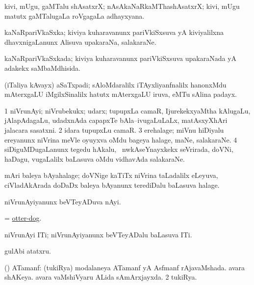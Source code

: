 \bentry
{}
\gl{\nA}
\bmng
kivi, mUgu, gaMTalu shAsatxrX; nAsAkaNaRkaMThashAsatxrX; kivi, mUgu matutx gaMTalugaLa roVgagaLa adhayxyana. 
\emng
\eentry

\bentry
{}
\gl{\nA}
\bmng
kaNaRpariVkaSxka; kiviya kuharavanunx pariVkiSxsuva yA kiviyalilxna dhavxnigaLanunx Alisuva upakaraNa, salakaraNe. 
\emng
\eentry

\bentry
{}
\gl{\gu}
\bmng
kaNaRpariVkaSxkada; kiviya kuharavanunx pariVkiSxsuva upakaraNada yA adakekx saMbaMdhisida. 
\emng
\eentry

\bentry
{}
\gl{\nA}
\expl{\It}
\bmng
(iTaliya kAvayx) aSaTxpadi; sAloMdaralilx iTAyxliyanfnalilx hanonxMdu mAterxgaLU iMgilxSinalilx hatutx mAterxgaLU iruva, eMTu sAlina padayx. 
\emng
\eentry

\bentry
{}
\gl{\nA}
\bmng
\bnum
\num{1} niVrunAyi; niVrubekukx; udarx; tupupxLa camaR, IjurekekxyaMtha kAlugaLu, jAlapAdagaLu, udadxnAda capapxTe bAla--ivugaLuLaLx, matAsxyXhAri jalacara sasatxni. 
\num{2} idara tupupxLu camaR. 
\num{3} erehalage; miVnu hiDiyalu ereyanunx niVrina meVle oyuyxva oMdu bageya halage, maNe, salakaraNe. 
\num{4} siDiguMDugaLanunx tegedu hAkalu, \kanmu\ nwkAseYnayxkekx seVrirada, doVNi, haDagu, \mo vugaLalilx baLasuva oMdu vidhavAda salakaraNe. 
\enum
\emng
\eentry

\bentry
{}
\gl{\nA}
\bmng
mAri baleya bAyahalage; doVNige kaTiTx niVrina taLadalilx eLeyuva, ciVladAkArada doDaDx baleya bAyanunx terediDalu baLasuva halage. 
\emng
\eentry

\bentry
{}
\gl{\nA}
\bmng
niVrunAyiyanunx beVTeyADuva nAyi. 
\emng
\eentry

\bentry
{}
\gl{\nA}
\bmng
= \hyperlink{otter-dog}{otter-dog}. 
\emng
\eentry

\bentry
{}
\gl{\nA}
\bmng
niVrunAyi ITi; niVrunAyiyanunx beVTeyADalu baLasuva ITi. 
\emng
\eentry

\bentry
{}
\gl{\nA}
\bmng
gulAbi atatxru. 
\emng
\eentry

\bentry
{}
\gl{\gu}
\bmng
(\ca) 
\bnum
{} ATamanf: 
\banum
{} (tukiRya) modalaneya ATamanf yA Asfmanf rAjavaMshada. 
 avara shAKeya. 
 avara vaMshiVyaru ALida sAmArxjayxda. 
\eanum
\numie
\num{2} tukiRya. 
\enum
\emng
\eentry

